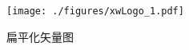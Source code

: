 
\begin{figure}[ht]
\centering
\texttt{[image: ./figures/xwLogo\_1.pdf]}
\caption{扁平化矢量图} \label{xwLogo_fig1}
\end{figure}
